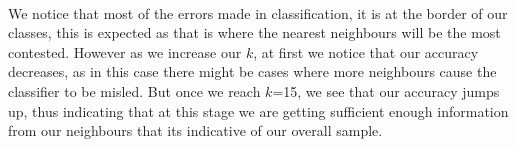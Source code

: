 \documentclass[11pt]{article}
\begin{document}
    \begin{center}
    \end{center}
    { \hspace*{\fill} \\}
    
    We notice that most of the errors made in classification, it is at the
border of our classes, this is expected as that is where the nearest
neighbours will be the most contested. However as we increase our \(k\),
at first we notice that our accuracy decreases, as in this case there
might be cases where more neighbours cause the classifier to be misled.
But once we reach \(k\)=15, we see that our accuracy jumps up, thus
indicating that at this stage we are getting sufficient enough
information from our neighbours that its indicative of our overall
sample.


    
    
    
    
\end{document}
